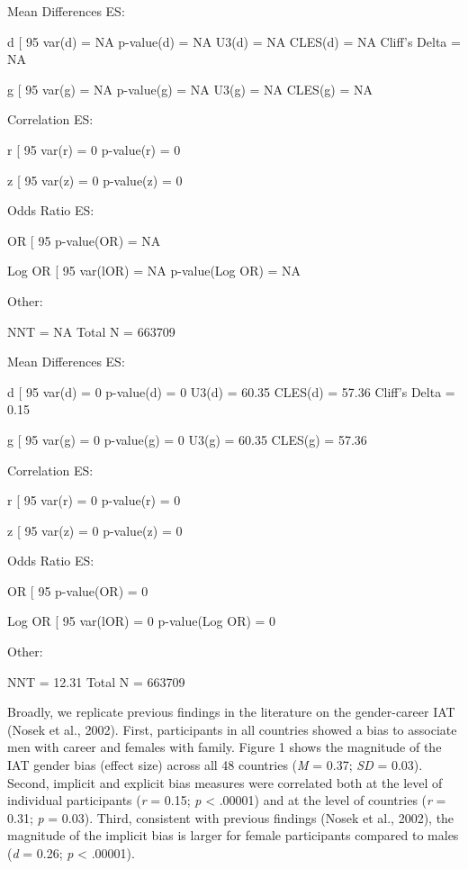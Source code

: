 \documentclass[10pt, letterpaper]{article}
\newenvironment{CodeChunk}{}{}
\begin{document}
\begin{CodeChunk}
\begin{CodeOutput}
Mean Differences ES: 
 
 d [ 95 %
  var(d) = NA 
  p-value(d) = NA 
  U3(d) = NA %
  CLES(d) = NA %
  Cliff's Delta = NA 
 
 g [ 95 %
  var(g) = NA 
  p-value(g) = NA 
  U3(g) = NA %
  CLES(g) = NA %
 
 Correlation ES: 
 
 r [ 95 %
  var(r) = 0 
  p-value(r) = 0 
 
 z [ 95 %
  var(z) = 0 
  p-value(z) = 0 
 
 Odds Ratio ES: 
 
 OR [ 95 %
  p-value(OR) = NA 
 
 Log OR [ 95 %
  var(lOR) = NA 
  p-value(Log OR) = NA 
 
 Other: 
 
 NNT = NA 
 Total N = 663709
\end{CodeOutput}
\begin{CodeOutput}
Mean Differences ES: 
 
 d [ 95 %
  var(d) = 0 
  p-value(d) = 0 
  U3(d) = 60.35 %
  CLES(d) = 57.36 %
  Cliff's Delta = 0.15 
 
 g [ 95 %
  var(g) = 0 
  p-value(g) = 0 
  U3(g) = 60.35 %
  CLES(g) = 57.36 %
 
 Correlation ES: 
 
 r [ 95 %
  var(r) = 0 
  p-value(r) = 0 
 
 z [ 95 %
  var(z) = 0 
  p-value(z) = 0 
 
 Odds Ratio ES: 
 
 OR [ 95 %
  p-value(OR) = 0 
 
 Log OR [ 95 %
  var(lOR) = 0 
  p-value(Log OR) = 0 
 
 Other: 
 
 NNT = 12.31 
 Total N = 663709
\end{CodeOutput}
\end{CodeChunk}

Broadly, we replicate previous findings in the literature on the
gender-career IAT (Nosek et al., 2002). First, participants in all
countries showed a bias to associate men with career and females with
family. Figure 1 shows the magnitude of the IAT gender bias (effect
size) across all 48 countries (\emph{M} = 0.37; \emph{SD} = 0.03).
Second, implicit and explicit bias measures were correlated both at the
level of individual participants (\emph{r} = 0.15; \emph{p} \textless{}
.00001) and at the level of countries (\emph{r} = 0.31; \emph{p} =
0.03). Third, consistent with previous findings (Nosek et al., 2002),
the magnitude of the implicit bias is larger for female participants
compared to males (\emph{d} = 0.26; \emph{p} \textless{} .00001).
\end{document}
